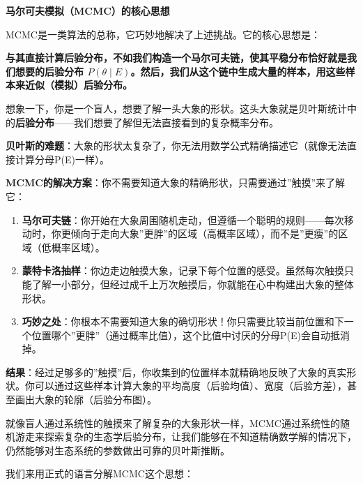 \documentclass[
]{book}
\begin{document}
\textbf{马尔可夫模拟（MCMC）的核心思想}

MCMC是一类算法的总称，它巧妙地解决了上述挑战。它的核心思想是：

\textbf{与其直接计算后验分布，不如我们构造一个马尔可夫链，使其平稳分布恰好就是我们想要的后验分布 \(P(\theta \mid E)\)。然后，我们从这个链中生成大量的样本，用这些样本来近似（模拟）后验分布。}

想象一下，你是一个盲人，想要了解一头大象的形状。这头大象就是贝叶斯统计中的\textbf{后验分布}------我们想要了解但无法直接看到的复杂概率分布。

\textbf{贝叶斯的难题}：大象的形状太复杂了，你无法用数学公式精确描述它（就像无法直接计算分母P(E)一样）。

\textbf{MCMC的解决方案}：你不需要知道大象的精确形状，只需要通过''触摸''来了解它：

\begin{enumerate}
\def\labelenumi{\arabic{enumi}.}
\item
  \textbf{马尔可夫链}：你开始在大象周围随机走动，但遵循一个聪明的规则------每次移动时，你更倾向于走向大象''更胖''的区域（高概率区域），而不是''更瘦''的区域（低概率区域）。
\item
  \textbf{蒙特卡洛抽样}：你边走边触摸大象，记录下每个位置的感受。虽然每次触摸只能了解一小部分，但经过成千上万次触摸后，你就能在心中构建出大象的整体形状。
\item
  \textbf{巧妙之处}：你根本不需要知道大象的确切形状！你只需要比较当前位置和下一个位置哪个''更胖''（通过概率比值），这个比值中讨厌的分母P(E)会自动抵消掉。
\end{enumerate}

\textbf{结果}：经过足够多的''触摸''后，你收集到的位置样本就精确地反映了大象的真实形状。你可以通过这些样本计算大象的平均高度（后验均值）、宽度（后验方差），甚至画出大象的轮廓（后验分布图）。

就像盲人通过系统性的触摸来了解复杂的大象形状一样，MCMC通过系统性的随机游走来探索复杂的生态学后验分布，让我们能够在不知道精确数学解的情况下，仍然能够对生态系统的参数做出可靠的贝叶斯推断。

我们来用正式的语言分解MCMC这个思想：
\end{document}
